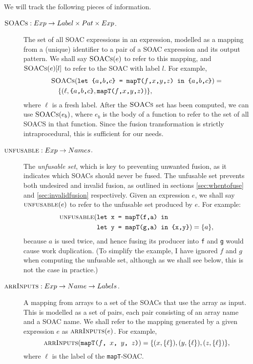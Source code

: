 We will track the following pieces of information.

\begin{description}
\item[$\textsc{SOACs} : Exp \rightarrow Label \times Pat \times Exp$.] The set
  of all SOAC expressions in an expression, modelled as a mapping from
  a (unique) identifier to a pair of a SOAC expression and its output
  pattern.  We shall say $\textsc{SOACs}(e)$ to refer to this mapping, and
  $\textsc{SOACs}(e)[l]$ to refer to the SOAC with label $l$.  For example,
  \begin{align*}
  & \textsc{SOACs}(\texttt{let \{$a$,$b$,$c$\} = mapT($f$,$x$,$y$,$z$) in \{$a$,$b$,$c$\}}) =\\
  & \quad \{ (\ell, \texttt{\{$a$,$b$,$c$\}},\texttt{mapT($f$,$x$,$y$,$z$)}) \},
  \end{align*}
  where $\ell$ is a fresh label.  After the $\textsc{SOACs}$ set has been
  computed, we can use $\textsc{SOACs}(e_{b})$, where $e_{b}$ is the body of a
  function to refer to the set of all SOACS in that function.  Since
  the fusion transformation is strictly intraprocedural, this is
  sufficient for our needs.

\item[$\textsc{unfusable} : Exp \rightarrow Names$.] The \textit{unfusable set}, which
  is key to preventing unwanted fusion, as it indicates which SOACs
  should never be fused.  The unfusable set prevents both undesired
  and invalid fusion, as outlined in sections \ref{sec:whentofuse} and
  \ref{sec:invalidfusion} respectively.  Given an \LO{} expression
  $e$, we shall say $\textsc{unfusable}(e)$ to refer to the unfusable set
  produced by $e$.  For example:
  \begin{align*}
  \textsc{unfusable}(&\texttt{let x = mapT(f,a) in}\\
  &\texttt{let y = mapT(g,a) in \{x,y\}}) = \{a\},
  \end{align*}
  because $a$ is used twice, and hence fusing its producer into
  \texttt{f} and \texttt{g} would cause work duplication.  (To
  simplify the example, I have ignored $f$ and $g$ when computing the
  unfusable set, although as we shall see below, this is not the case
  in practice.)

\item[$\textsc{arrInputs} : Exp \rightarrow Name \rightarrow Labels$.] A mapping from arrays to a set of the SOACs that use the array
  as input.  This is modelled as a set of pairs, each pair consisting
  of an array name and a SOAC name.  We shall refer to the mapping
  generated by a given expression $e$ as $\textsc{arrInputs}(e)$.  For example,
  \[
  \textsc{arrInputs}(\texttt{mapT($f$, $x$, $y$, $z$)}) = \{ (x, \{\ell\}), (y, \{\ell\}), (z, \{\ell\}) \},
  \]
  where $\ell$ is the label of the \texttt{mapT}-SOAC.


\end{description}
